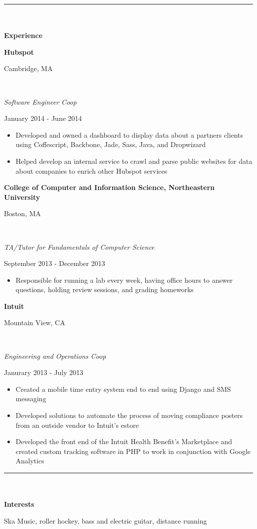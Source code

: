 \documentclass[14pt]{article}
\newcommand\textboxhalf[1]{%
  \parbox{.5\textwidth}{#1}%
}
\newcommand\textboxquarter[1]{%
  \parbox{.25\textwidth}{#1}%
}
\newcommand\textboxthreequarter[1]{%
  \parbox{.75\textwidth}{#1}%
}
\begin{document}
\noindent\rule{16.5cm}{0.4pt}
\\
\\
\noindent\textbf{\Large{Experience}}
\\
\noindent\textboxhalf{\textbf{Hubspot\hfill}}\textboxhalf{\hfill Cambridge, MA}
\\
\noindent\textboxhalf{\textit{Software Engineer Coop}\hfill}\textboxhalf{\hfill January 2014 - June 2014}
\begin{itemize} [noitemsep, nolistsep]
\item Developed and owned a dashboard to display data about a partners clients using Coffescript, Backbone, Jade, Sass, Java, and Dropwizard
\item Helped develop an internal service to crawl and parse public websites for data about companies to enrich other Hubspot services
\end{itemize}

\noindent\textboxthreequarter{\textbf{College of Computer and Information Science, Northeastern University\hfill}}\textboxquarter{\hfill Boston, MA}
\\
\noindent\textboxhalf{\textit{TA/Tutor for Fundamentals of Computer Science}\hfill}\textboxhalf{\hfill September 2013 - December 2013}
\begin{itemize} [noitemsep, nolistsep]
\item Responsible for running a lab every week, having office hours to answer questions, holding review sessions, and grading homeworks
\end{itemize}

\noindent\textboxthreequarter{\textbf{Intuit\hfill}}\textboxquarter{\hfill Mountain View, CA}
\\
\noindent\textboxthreequarter{\textit{Engineering and Operations Coop}\hfill}\textboxquarter{\hfill Janurary 2013 - July 2013}
\begin{itemize} [noitemsep, nolistsep]
\item Created a mobile time entry system end to end using Django and SMS messaging
\item Developed solutions to automate the process of moving compliance posters from an outside vendor to Intuit’s estore
\item Developed the front end of the Intuit Health Benefit’s Marketplace and created custom tracking software in PHP to work in conjunction with Google Analytics
\end{itemize}

\noindent\rule{16.5cm}{0.4pt}
\\
\\
\noindent\textbf{\Large{Interests}}
\\
\textboxquarter{\hfill}\textboxthreequarter{Ska Music, roller hockey, bass and electric guitar, distance running}
\end{document}
